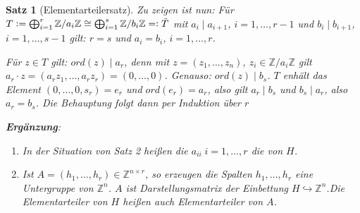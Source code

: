 \documentclass[a4paper,10pt,german]{scrbook}
\theoremstyle{saetze}
\newtheorem{Satz}{Satz}
\theoremstyle{definitionen}
\begin{document}
\begin{Satz}[Elementarteilersatz]
{	Zu zeigen ist nun: Für $T \mathrel{\mathop:}= \bigoplus_{i=1}^r \mathbb Z / a_i \mathbb Z \cong\bigoplus_{i=1}^s \mathbb Z / b_i \mathbb Z =\mathrel{\mathop:} \tilde T$ mit $a_i\mid a_{i+1}$, $i=1,\ldots,r-1$ und $b_i\mid b_{i+1}$, $i=1,\ldots,s-1$ gilt: $r=s$ und $a_i=b_i$, $i=1,\ldots,r$.

	Für $z\in T$ gilt: $ord(z)\mid a_r$, denn mit $z=(z_1,\ldots,z_n)$, $z_i\in \mathbb Z/a_i \mathbb Z$ gilt $a_r \cdot z = (a_rz_1,\ldots,a_rz_r) = (0,\ldots,0)$. Genauso: $ord(z) \mid b_s$. $T$ enhält das Element $(0,\ldots,0,s_r)=e_r$ und $ord(e_r)=a_r$, also gilt $a_r\mid b_s$ und $b_s\mid a_r$, also $a_r = b_s$. Die Behauptung folgt dann per Induktion über $r$
    }

    \textbf{Ergänzung}:
        \begin{enumerate}
            \item[(1)]In der Situation von Satz 2 heißen die $a_{ii}\; 
            i=1,\dots,r$ die  von $H$.
            
            \item[(2)] Ist $A = (h_1,\dots,h_r) \in \mathbb{Z}^{n\times r}$, so
            erzeugen die Spalten $h_1,\dots,h_r$ eine Untergruppe von 
            $\mathbb{Z}^n$. $A$ ist Darstellungsmatrix der Einbettung $H \hookrightarrow 
            \mathbb{Z}^n$.\newline Die Elementarteiler von $H$ heißen auch 
            Elementarteiler von $A$.
        \end{enumerate}
\end{Satz}
\end{document}
